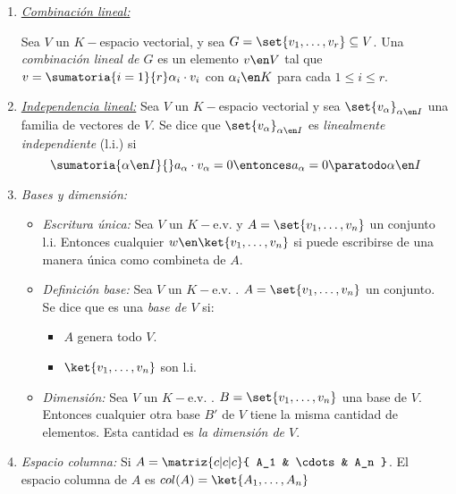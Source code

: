 \begin{enumerate}[label=\tiny\purple{\faIcon{snowman}}]
\item \hypertarget{teoria-1:combinacion-lineal}{\textit{\ul{Combinación lineal:}}}

        Sea $V$ un $K-$espacio vectorial, y sea $G = \set{v_1,\ldots,v_r} \subseteq V$.
        Una \textit{combinación lineal de $G$} es un elemento $v \en V$ tal que $v = \sumatoria{i=1}{r} \alpha_i \cdot v_i$ con
        $\alpha_i \en K$ para cada $1 \leq i \leq r$.

  \item\textit{\ul{Independencia lineal:}}
        Sea $V$ un $K-$espacio vectorial y sea $\set{v_\alpha}_{\alpha \en I}$ una familia de vectores de $V$. Se
        dice que  $\set{v_{\alpha}}_{\alpha \en I}$ es \textit{linealmente independiente} (l.i.) si
        $$
          \sumatoria{\alpha \en I}{} a_{\alpha} \cdot v_{\alpha} = 0 \entonces a_{\alpha} = 0 \paratodo \alpha \en I
        $$

  \item \textit{Bases y dimensión:}
        \begin{itemize}
          \item \textit{Escritura única:}
                Sea $V$ un $K-$e.v. y $A = \set{v_1,\ldots,v_n}$ un conjunto l.i. Entonces cualquier $w \en \ket{v_1,\ldots, v_n}$ si puede
                escribirse de una manera única como combineta de $A$.

          \item \textit{Definición base:}
                Sea $V$ un $K-$e.v. . $A = \set{v_1,\ldots,v_n}$ un conjunto. Se dice que es una \textit{base de $V$} si:
                \begin{itemize}
                  \item $A$ genera todo $V$.
                  \item $\ket{v_1,\ldots, v_n}$ son l.i.
                \end{itemize}

          \item \textit{Dimensión:}
                Sea $V$ un $K-$e.v. . $B = \set{v_1,\ldots,v_n}$ una base de $V$. Entonces cualquier otra base $B'$ de $V$ tiene
                la misma cantidad de elementos. Esta cantidad es \textit{la dimensión de $V$}.
        \end{itemize}

  \item \textit{Espacio columna:} Si
        $A =
          \matriz{c|c|c}{
            A_1 & \cdots & A_n
          }
        $. El espacio columna de $A$ es $col(A) = \ket{A_1, \ldots, A_n}$


\end{enumerate}

